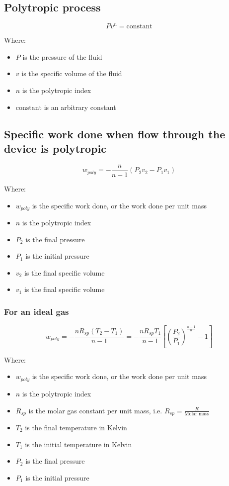 \documentclass[11pt]{article}
\begin{document}
\subsection{Polytropic process}
\label{sec:org5456078}
\[Pv^n = \text{constant}\]

Where:
\begin{itemize}
\item \(P\) is the pressure of the fluid
\item \(v\) is the specific volume of the fluid
\item \(n\) is the polytropic index
\item \(\text{constant}\) is an arbitrary constant
\end{itemize}
\subsection{Specific work done when flow through the device is polytropic}
\label{sec:org191344c}
\[w_{poly} = - \frac{n}{n - 1}(P_2 v_2 - P_1 v_1)\]

Where:
\begin{itemize}
\item \(w_{poly}\) is the specific work done, or the work done per unit mass
\item \(n\) is the polytropic index
\item \(P_2\) is the final pressure
\item \(P_1\) is the initial pressure
\item \(v_2\) is the final specific volume
\item \(v_1\) is the final specific volume
\end{itemize}
\subsubsection{For an ideal gas}
\label{sec:orgb1a03c8}
\[w_{poly} = - \frac{n R_{sp} (T_2 - T_1)}{n - 1} = - \frac{n R_{sp} T_1}{n - 1} \left[\left(\frac{P_2}{P_1} \right)^{\frac{n - 1}{n}} - 1 \right]\]

Where:
\begin{itemize}
\item \(w_{poly}\) is the specific work done, or the work done per unit mass
\item \(n\) is the polytropic index
\item \(R_{sp}\) is the molar gas constant per unit mass, i.e. \(R_{sp} = \frac{R}{\text{Molar mass}}\)
\item \(T_2\) is the final temperature in Kelvin
\item \(T_1\) is the initial temperature in Kelvin
\item \(P_2\) is the final pressure
\item \(P_1\) is the initial pressure
\end{itemize}
\end{document}
